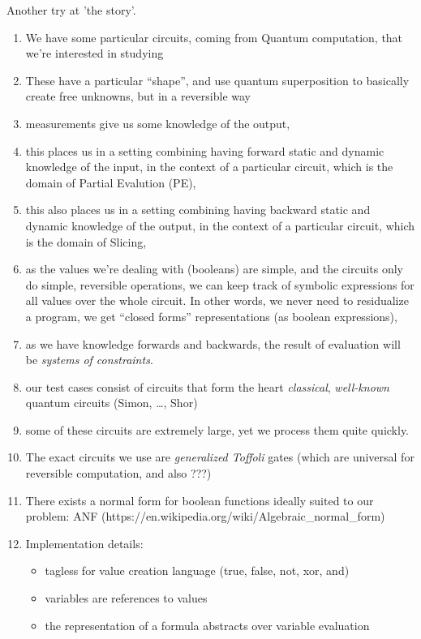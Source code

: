\documentclass[sigplan]{acmart}
\begin{document}
Another try at 'the story'.
\begin{enumerate}
  \item We have some particular circuits, coming from Quantum computation,
    that we're interested in studying
  \item These have a particular ``shape'', and use quantum superposition to 
    basically create free unknowns, but in a reversible way
  \item measurements give us some knowledge of the output,
  \item this places us in a setting combining having forward static and
    dynamic knowledge of the input, in the context of a particular circuit,
    which is the domain of Partial Evalution (PE),
  \item this also places us in a setting combining having backward static and
    dynamic knowledge of the output, in the context of a particular circuit,
    which is the domain of Slicing,
  \item as the values we're dealing with (booleans) are simple, and the
    circuits only do simple, reversible operations, we can keep track of
    symbolic expressions for all values over the whole circuit. In other
    words, we never need to residualize a program, we get ``closed forms''
    representations (as boolean expressions),
  \item as we have knowledge forwards and backwards, the result of
    evaluation will be \emph{systems of constraints}.
  \item our test cases consist of circuits that form the heart \emph{classical},
    \emph{well-known} quantum circuits (Simon, \ldots, Shor)
  \item some of these circuits are extremely large, yet we process them quite
    quickly.
  \item The exact circuits we use are \emph{generalized Toffoli} gates (which
    are universal for reversible computation, and also ???)
  \item There exists a normal form for boolean functions ideally suited to our problem:
    ANF (https://en.wikipedia.org/wiki/Algebraic_normal_form)
  \item Implementation details:
    \begin{itemize}
      \item tagless for value creation language (true, false, not, xor, and)
      \item variables are references to values
      \item the representation of a formula abstracts over variable evaluation 

\end{itemize}
\end{enumerate}
\end{document}
